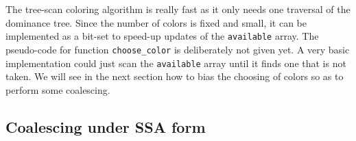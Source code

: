 {%






The tree-scan coloring algorithm is really fast as it only needs one traversal of the dominance tree. 
Since the number of colors is fixed and small, it can be implemented as a bit-set to speed-up updates of the {\tt available} array.
The pseudo-code for function {\tt choose\_color} is deliberately not given yet. 
A very basic implementation could just scan the {\tt available} array until it finds one that is not taken.
We will see in the next section how to bias the choosing of colors so as to perform some coalescing. 
 


\subsection{Coalescing under SSA form}

}
